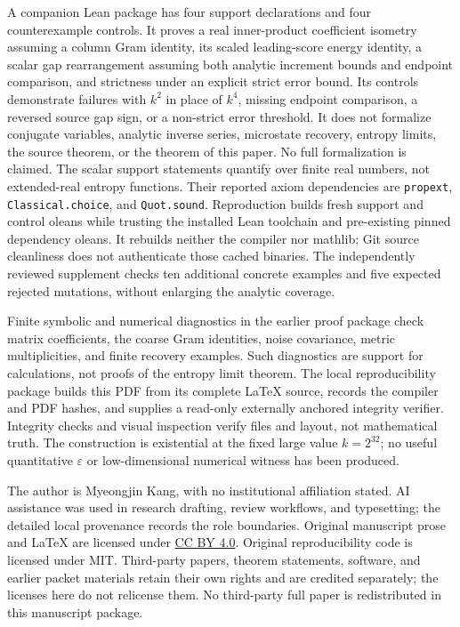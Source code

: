 \documentclass[11pt]{article}
\theoremstyle{definition}\newtheorem{definition}[theorem]{Definition}
\theoremstyle{remark}\newtheorem{remark}[theorem]{Remark}
\newcommand{\eps}{\varepsilon}\newcommand{\id}{\mathrm{id}}
\begin{document}
A companion Lean package has four support declarations and four
counterexample controls. It proves a real inner-product coefficient
isometry assuming a column Gram identity, its scaled leading-score
energy identity, a scalar gap rearrangement assuming both analytic
increment bounds and endpoint comparison, and strictness under an
explicit strict error bound. Its controls demonstrate failures with
$k^2$ in place of $k^4$, missing endpoint comparison, a reversed source
gap sign, or a non-strict error threshold. It does not formalize
conjugate variables, analytic inverse series, microstate recovery,
entropy limits, the source theorem, or the theorem of this paper.
No full formalization is claimed. The scalar support statements
quantify over finite real numbers, not extended-real entropy functions.
Their reported axiom dependencies are \texttt{propext},
\texttt{Classical.choice}, and \texttt{Quot.sound}. Reproduction builds
fresh support and control oleans while trusting the installed Lean
toolchain and pre-existing pinned dependency oleans. It rebuilds
neither the compiler nor mathlib; Git source cleanliness does not
authenticate those cached binaries. The independently reviewed
supplement checks ten additional concrete examples and five expected
rejected mutations, without enlarging the analytic coverage.

Finite symbolic and numerical diagnostics in the earlier proof package
check matrix coefficients, the coarse Gram identities, noise covariance,
metric multiplicities, and finite recovery examples. Such diagnostics
are support for calculations, not proofs of the entropy limit theorem.
The local reproducibility package builds this PDF from its complete
LaTeX source, records the compiler and PDF hashes, and supplies a
read-only externally anchored integrity verifier. Integrity checks and
visual inspection verify files and layout, not mathematical truth.
The construction is existential at the fixed large value $k=2^{32}$;
no useful quantitative $\eps$ or low-dimensional numerical witness
has been produced.

The author is Myeongjin Kang, with no institutional affiliation stated.
AI assistance was used in research drafting, review workflows, and
typesetting; the detailed local provenance records the role boundaries.
Original manuscript prose and LaTeX are licensed under
\href{https://creativecommons.org/licenses/by/4.0/}{CC BY 4.0}.
Original reproducibility code is licensed under MIT. Third-party
papers, theorem statements, software, and earlier packet materials
retain their own rights and are credited separately; the licenses here
do not relicense them. No third-party full paper is redistributed in
this manuscript package.
\end{document}
